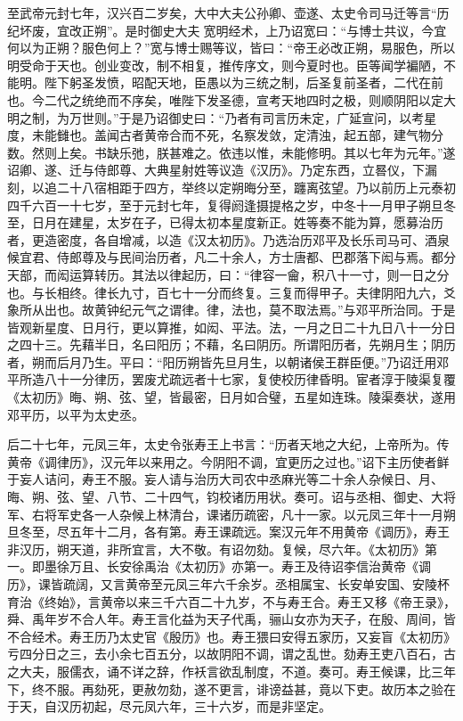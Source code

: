 \documentclass[12pt,UTF8]{ctexbook}
\begin{document}
至武帝元封七年，汉兴百二岁矣，大中大夫公孙卿、壶遂、太史令司马迁等言“历纪坏废，宜改正朔”。是时御史大夫宽明经术，上乃诏宽曰：“与博士共议，今宜何以为正朔？服色何上？”宽与博士赐等议，皆曰：“帝王必改正朔，易服色，所以明受命于天也。创业变改，制不相复，推传序文，则今夏时也。臣等闻学褊陋，不能明。陛下躬圣发愤，昭配天地，臣愚以为三统之制，后圣复前圣者，二代在前也。今二代之统绝而不序矣，唯陛下发圣德，宣考天地四时之极，则顺阴阳以定大明之制，为万世则。”于是乃诏御史曰：“乃者有司言历未定，广延宣问，以考星度，未能雠也。盖闻古者黄帝合而不死，名察发敛，定清浊，起五部，建气物分数。然则上矣。书缺乐弛，朕甚难之。依违以惟，未能修明。其以七年为元年。”遂诏卿、遂、迁与侍郎尊、大典星射姓等议造《汉历》。乃定东西，立晷仪，下漏刻，以追二十八宿相距于四方，举终以定朔晦分至，躔离弦望。乃以前历上元泰初四千六百一十七岁，至于元封七年，复得阏逢摄提格之岁，中冬十一月甲子朔旦冬至，日月在建星，太岁在子，已得太初本星度新正。姓等奏不能为算，愿募治历者，更造密度，各自增减，以造《汉太初历》。乃选治历邓平及长乐司马可、酒泉候宜君、侍郎尊及与民间治历者，凡二十余人，方士唐都、巴郡落下闳与焉。都分天部，而闳运算转历。其法以律起历，曰：“律容一龠，积八十一寸，则一日之分也。与长相终。律长九寸，百七十一分而终复。三复而得甲子。夫律阴阳九六，爻象所从出也。故黄钟纪元气之谓律。律，法也，莫不取法焉。”与邓平所治同。于是皆观新星度、日月行，更以算推，如闳、平法。法，一月之日二十九日八十一分日之四十三。先藉半日，名曰阳历；不藉，名曰阴历。所谓阳历者，先朔月生；阴历者，朔而后月乃生。平曰：“阳历朔皆先旦月生，以朝诸侯王群臣便。”乃诏迁用邓平所造八十一分律历，罢废尤疏远者十七家，复使校历律昏明。宦者淳于陵渠复覆《太初历》晦、朔、弦、望，皆最密，日月如合璧，五星如连珠。陵渠奏状，遂用邓平历，以平为太史丞。



后二十七年，元凤三年，太史令张寿王上书言：“历者天地之大纪，上帝所为。传黄帝《调律历》，汉元年以来用之。今阴阳不调，宜更历之过也。”诏下主历使者鲜于妄人诘问，寿王不服。妄人请与治历大司农中丞麻光等二十余人杂候日、月、晦、朔、弦、望、八节、二十四气，钧校诸历用状。奏可。诏与丞相、御史、大将军、右将军史各一人杂候上林清台，课诸历疏密，凡十一家。以元凤三年十一月朔旦冬至，尽五年十二月，各有第。寿王课疏远。案汉元年不用黄帝《调历》，寿王非汉历，朔天道，非所宜言，大不敬。有诏勿劾。复候，尽六年。《太初历》第一。即墨徐万且、长安徐禹治《太初历》亦第一。寿王及待诏李信治黄帝《调历》，课皆疏阔，又言黄帝至元凤三年六千余岁。丞相属宝、长安单安国、安陵杯育治《终始》，言黄帝以来三千六百二十九岁，不与寿王合。寿王又移《帝王录》，舜、禹年岁不合人年。寿王言化益为天子代禹，骊山女亦为天子，在殷、周间，皆不合经术。寿王历乃太史官《殷历》也。寿王猥曰安得五家历，又妄盲《太初历》亏四分日之三，去小余七百五分，以故阴阳不调，谓之乱世。劾寿王吏八百石，古之大夫，服儒衣，诵不详之辞，作袄言欲乱制度，不道。奏可。寿王候课，比三年下，终不服。再劾死，更赦勿劾，遂不更言，诽谤益甚，竟以下吏。故历本之验在于天，自汉历初起，尽元凤六年，三十六岁，而是非坚定。
\end{document}
